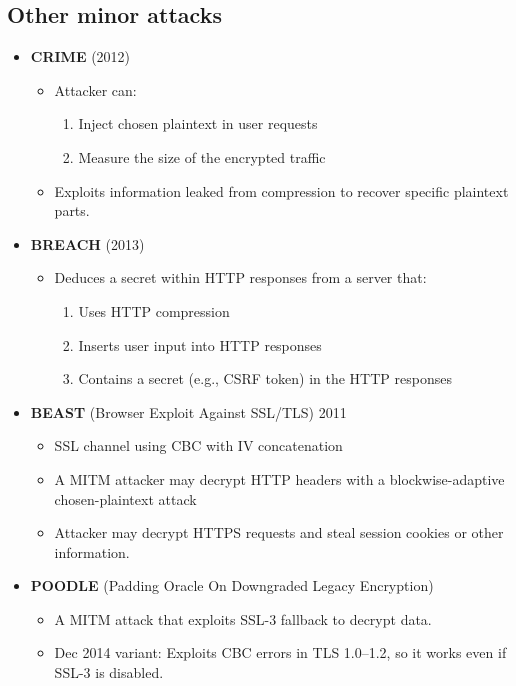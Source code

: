 \subsection{Other minor attacks}
\begin{itemize}
    \item \textbf{CRIME} (2012)
    \begin{itemize}
        \item Attacker can:
        \begin{enumerate}
            \item Inject chosen plaintext in user requests
            \item Measure the size of the encrypted traffic
        \end{enumerate}
        \item Exploits information leaked from compression to recover specific plaintext parts.
    \end{itemize}

    \item \textbf{BREACH} (2013)
    \begin{itemize}
        \item Deduces a secret within HTTP responses from a server that:
        \begin{enumerate}
            \item Uses HTTP compression
            \item Inserts user input into HTTP responses
            \item Contains a secret (e.g., CSRF token) in the HTTP responses
        \end{enumerate}
    \end{itemize}

    \item \textbf{BEAST} (Browser Exploit Against SSL/TLS) 2011
    \begin{itemize}
        \item SSL channel using CBC with IV concatenation
        \item A MITM attacker may decrypt HTTP headers with a blockwise-adaptive chosen-plaintext attack
        \item Attacker may decrypt HTTPS requests and steal session cookies or other information.
    \end{itemize}

    \item \textbf{POODLE} (Padding Oracle On Downgraded Legacy Encryption)
    \begin{itemize}
        \item A MITM attack that exploits SSL-3 fallback to decrypt data.
        \item Dec 2014 variant: Exploits CBC errors in TLS 1.0–1.2, so it works even if SSL-3 is disabled.
    \end{itemize}


\end{itemize}
